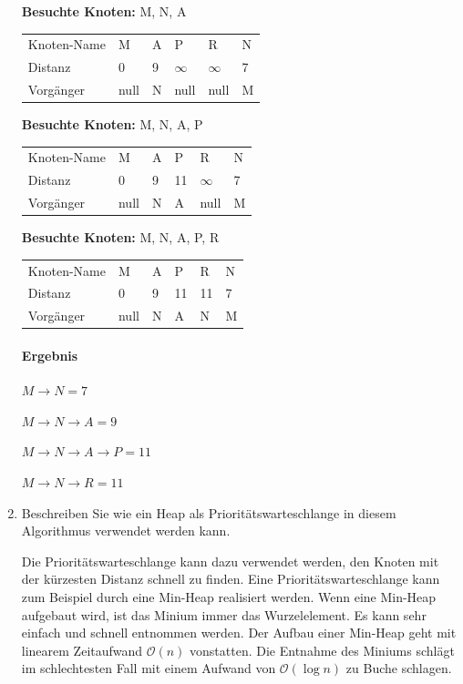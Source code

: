 \documentclass{lehramt-informatik-haupt}
\begin{document}
\begin{enumerate}
\textbf{Besuchte Knoten:} M, N, A

\begin{tabular}{l||l|l|l|l|l}
Knoten-Name & M    & A        & P        & R        & N  \\
Distanz     & 0    & 9        & $\infty$ & $\infty$ & 7 \\
Vorgänger   & null & N        & null     & null     & M \\
\end{tabular}

\textbf{Besuchte Knoten:} M, N, A, P

\begin{tabular}{l||l|l|l|l|l}
Knoten-Name & M    & A        & P        & R        & N  \\
Distanz     & 0    & 9        & 11       & $\infty$ & 7 \\
Vorgänger   & null & N        & A        & null     & M \\
\end{tabular}

\textbf{Besuchte Knoten:} M, N, A, P, R

\begin{tabular}{l||l|l|l|l|l}
Knoten-Name & M    & A        & P        & R        & N  \\
Distanz     & 0    & 9        & 11       & 11       & 7 \\
Vorgänger   & null & N        & A        & N        & M \\
\end{tabular}

\paragraph{Ergebnis}

$M \rightarrow N = 7$

$M \rightarrow N \rightarrow A = 9$

$M \rightarrow N \rightarrow A \rightarrow P = 11$

$M \rightarrow N \rightarrow R = 11$


\item Beschreiben Sie wie ein Heap als Prioritätswarteschlange in diesem
Algorithmus verwendet werden kann.

\begin{antwort}
Die Prioritätswarteschlange kann dazu verwendet werden, den Knoten mit
der kürzesten Distanz schnell zu finden. Eine Prioritätswarteschlange
kann zum Beispiel durch eine Min-Heap realisiert werden. Wenn eine
Min-Heap aufgebaut wird, ist das Minium immer das Wurzelelement. Es kann
sehr einfach und schnell entnommen werden. Der Aufbau einer Min-Heap
geht mit linearem Zeitaufwand $\mathcal{O}(n)$ vonstatten. Die
Entnahme des Miniums schlägt im schlechtesten Fall mit einem Aufwand
von $\mathcal{O}(\log n)$ zu Buche schlagen.
\end{antwort}


\end{enumerate}
\end{document}
